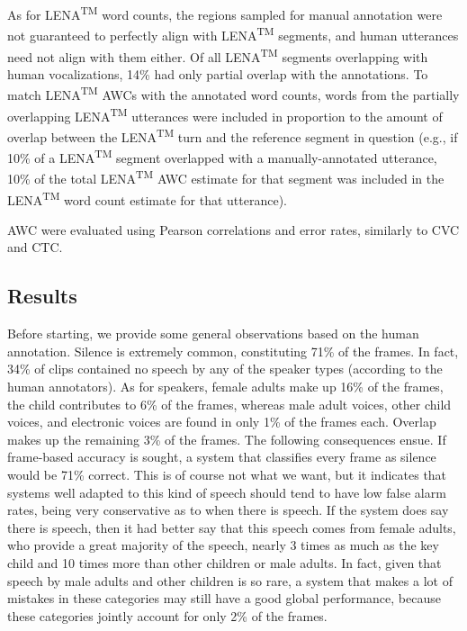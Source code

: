 \documentclass[english,floatsintext,man]{apa6}
\begin{document}
As for LENA\textsuperscript{TM} word counts, the regions sampled for
manual annotation were not guaranteed to perfectly align with
LENA\textsuperscript{TM} segments, and human utterances need not align
with them either. Of all LENA\textsuperscript{TM} segments overlapping
with human vocalizations, 14\% had only partial overlap with the
annotations. To match LENA\textsuperscript{TM} AWCs with the annotated
word counts, words from the partially overlapping
LENA\textsuperscript{TM} utterances were included in proportion to the
amount of overlap between the LENA\textsuperscript{TM} turn and the
reference segment in question (e.g., if 10\% of a
LENA\textsuperscript{TM} segment overlapped with a manually-annotated
utterance, 10\% of the total LENA\textsuperscript{TM} AWC estimate for
that segment was included in the LENA\textsuperscript{TM} word count
estimate for that utterance).

AWC were evaluated using Pearson correlations and error rates, similarly
to CVC and CTC.

\subsection{Results}\label{results}

Before starting, we provide some general observations based on the human
annotation. Silence is extremely common, constituting 71\% of the
frames. In fact, 34\% of clips contained no speech by any of the speaker
types (according to the human annotators). As for speakers, female
adults make up 16\% of the frames, the child contributes to 6\% of the
frames, whereas male adult voices, other child voices, and electronic
voices are found in only 1\% of the frames each. Overlap makes up the
remaining 3\% of the frames. The following consequences ensue. If
frame-based accuracy is sought, a system that classifies every frame as
silence would be 71\% correct. This is of course not what we want, but
it indicates that systems well adapted to this kind of speech should
tend to have low false alarm rates, being very conservative as to when
there is speech. If the system does say there is speech, then it had
better say that this speech comes from female adults, who provide a
great majority of the speech, nearly 3 times as much as the key child
and 10 times more than other children or male adults. In fact, given
that speech by male adults and other children is so rare, a system that
makes a lot of mistakes in these categories may still have a good global
performance, because these categories jointly account for only 2\% of
the frames.
\end{document}
